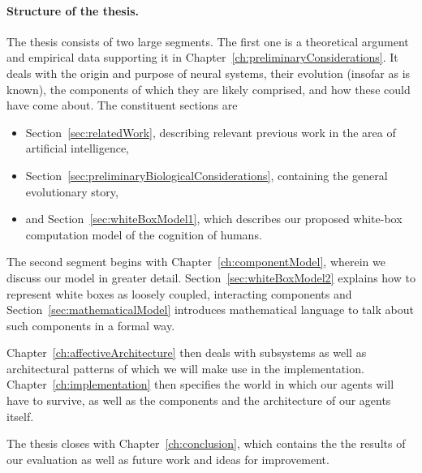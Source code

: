 \paragraph{Structure of the thesis.} The thesis consists of two large segments. The first one is a theoretical argument and empirical data supporting it in Chapter~\ref{ch:preliminaryConsiderations}. It deals with the origin and purpose of neural systems, their evolution (insofar as is known), the components of which they are likely comprised, and how these could have come about. The constituent sections are
	\begin{itemize}
		\item Section~\ref{sec:relatedWork}, describing relevant previous work in the area of artificial intelligence,
		\item Section~\ref{sec:preliminaryBiologicalConsiderations}, containing the general evolutionary story,
		\item and Section~\ref{sec:whiteBoxModel1}, which describes our proposed white-box computation model of the cognition of humans.
	\end{itemize}

The second segment begins with Chapter~\ref{ch:componentModel}, wherein we discuss our model in greater detail. Section~\ref{sec:whiteBoxModel2} explains how to represent white boxes as loosely coupled, interacting components and Section~\ref{sec:mathematicalModel} introduces mathematical language to talk about such components in a formal way.

Chapter~\ref{ch:affectiveArchitecture} then deals with subsystems as well as architectural patterns of which we will make use in the implementation. Chapter~\ref{ch:implementation} then specifies the world in which our agents will have to survive, as well as the components and the architecture of our agents itself.

The thesis closes with Chapter~\ref{ch:conclusion}, which contains the the results of our evaluation as well as future work and ideas for improvement.




